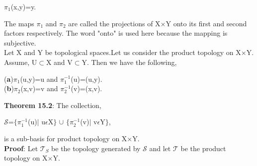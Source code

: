 \documentclass[a4paper,english,12pt]{article}
\begin{document}
\begin{flushleft}
\begin{center}
$\pi_1$(x,y)=y. \\
\end{center}
The maps $\pi_1$ and $\pi_2$ are called the projections of X$\times$Y onto its first and second factors respectively. The word "onto" is used here because the mapping is subjective.\\
Let X and Y be topological spaces.Let us consider the product topology on X$\times$Y. Assume, U$\subset$X and V$\subset$Y. Then we have the following,\\
\begin{center}
({\bf a})$\pi_1$(u,y)=u and $\pi^{-1}_1$(u)=(u,y).\\
({\bf b})$\pi_2$(x,v)=v and $\pi^{-1}_2$(v)=(x,v).\\
\end{center}
{\bf Theorem 15.2}: The collection,
\begin{center}
$\mathscr{S}$=$\{\pi^{-1}_1$(u)$\mid$ u$\epsilon$X$\}$ $\cup$ $\{\pi^{-1}_2$(v)$\mid$ v$\epsilon$Y$\}$,\\
\end{center}
is a sub-basis for product topology on X$\times$Y.\\
{\bf Proof}: Let $\mathscr{T}_S$ be the topology generated by $\mathscr{S}$ and let $\mathscr{T}$  be the product topology on X$\times$Y.

\end{flushleft}
\end{document}
